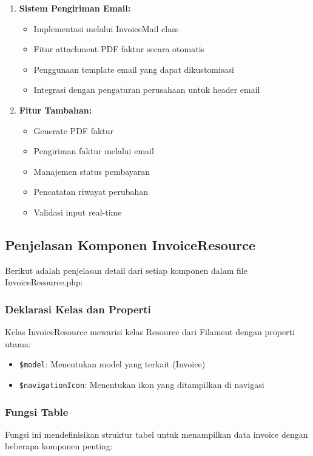 \documentclass[a4paper]{report}
\begin{document}
\begin{enumerate}
\item \textbf{Sistem Pengiriman Email:}
    \begin{itemize}
    \item Implementasi melalui InvoiceMail class
    \item Fitur attachment PDF faktur secara otomatis
    \item Penggunaan template email yang dapat dikustomisasi
    \item Integrasi dengan pengaturan perusahaan untuk header email
    \end{itemize}

\item \textbf{Fitur Tambahan:}
    \begin{itemize}
    \item Generate PDF faktur
    \item Pengiriman faktur melalui email
    \item Manajemen status pembayaran
    \item Pencatatan riwayat perubahan
    \item Validasi input real-time
    \end{itemize}
\end{enumerate}

\subsection{Penjelasan Komponen InvoiceResource}
Berikut adalah penjelasan detail dari setiap komponen dalam file InvoiceResource.php:

\subsubsection{Deklarasi Kelas dan Properti}
Kelas InvoiceResource mewarisi kelas Resource dari Filament dengan properti utama:
\begin{itemize}
    \item \texttt{\$model}: Menentukan model yang terkait (Invoice)
    \item \texttt{\$navigationIcon}: Menentukan ikon yang ditampilkan di navigasi
\end{itemize}

\subsubsection{Fungsi Table}
Fungsi ini mendefinisikan struktur tabel untuk menampilkan data invoice dengan beberapa komponen penting:
\end{document}

